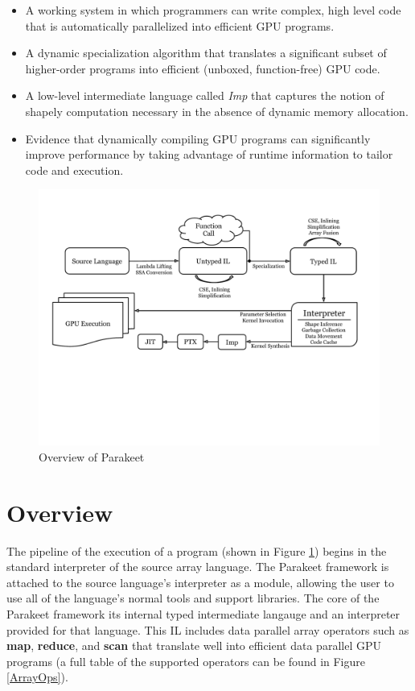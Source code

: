 \documentclass[preprint]{sigplanconf}
\begin{document}
\begin{itemize}
\item A working system in which programmers can write complex, high level code
that is automatically parallelized into efficient GPU programs.
\item A dynamic specialization algorithm that translates a significant subset of
higher-order programs into efficient (unboxed, function-free) GPU code.
\item A low-level intermediate language called \textit{Imp} that captures the
notion of shapely computation \cite{Jay97} necessary in the absence of dynamic
memory allocation.
\item Evidence that dynamically compiling GPU programs can significantly
improve performance by taking advantage of runtime information to
tailor code and execution.
\end{itemize}

\begin{figure}[t!bh]
\begin{center}
\leavevmode
\includegraphics[scale=0.6, trim=10pt 180pt 10pt 120pt]{Pipeline.pdf}
\end{center}
\caption{Overview of Parakeet}
\label{fig:overview}
\end{figure}
\section{Overview}


The pipeline of the execution of a program (shown in Figure
\ref{fig:overview}) begins in the standard interpreter of the source array
language.  The Parakeet framework is attached to the source language's
interpreter as a module, allowing the user to use all of the language's normal
tools and support libraries.  The core of the Parakeet framework its internal
typed intermediate langauge and an interpreter provided for that language. This
IL includes data parallel array operators such as \textbf{map},
\textbf{reduce}, and \textbf{scan} that translate well into efficient data
parallel GPU programs (a full table of the supported operators
can be found in Figure \ref{ArrayOps}).
\end{document}
